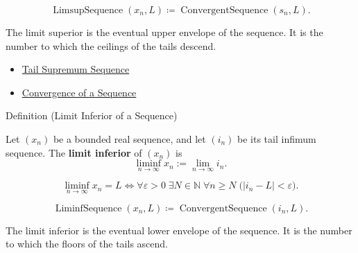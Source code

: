 \begin{remark*}
\[
\operatorname{LimsupSequence}(x_n,L)
\coloneqq
\operatorname{ConvergentSequence}(s_n,L).
\]
\end{remark*}

\begin{remark*}[Interpretation]
The limit superior is the eventual upper envelope of the sequence. It is the
number to which the ceilings of the tails descend.
\end{remark*}

\begin{dependencies}
\begin{itemize}
  \item \hyperref[def:tail-supremum-sequence]{Tail Supremum Sequence}
  \item \hyperref[def:convergent-sequence]{Convergence of a Sequence}
\end{itemize}
\end{dependencies}


\begin{definitionbox}{Definition (Limit Inferior of a Sequence)}
\begin{definition}
\label{def:liminf-sequence}
Let $(x_n)$ be a bounded real sequence, and let $(i_n)$ be its tail
infimum sequence. The \textbf{limit inferior} of $(x_n)$ is
\[
  \liminf_{n\to\infty}x_n:=\lim_{n\to\infty}i_n.
\]
\end{definition}
\end{definitionbox}

\begin{remark*}
\[
\liminf_{n\to\infty}x_n=L
\Longleftrightarrow
\forall \varepsilon>0\;\exists N\in\mathbb{N}\;\forall n\ge N
\;\bigl(|i_n-L|<\varepsilon\bigr).
\]
\end{remark*}

\begin{remark*}
\[
\operatorname{LiminfSequence}(x_n,L)
\coloneqq
\operatorname{ConvergentSequence}(i_n,L).
\]
\end{remark*}

\begin{remark*}[Interpretation]
The limit inferior is the eventual lower envelope of the sequence. It is the
number to which the floors of the tails ascend.
\end{remark*}

